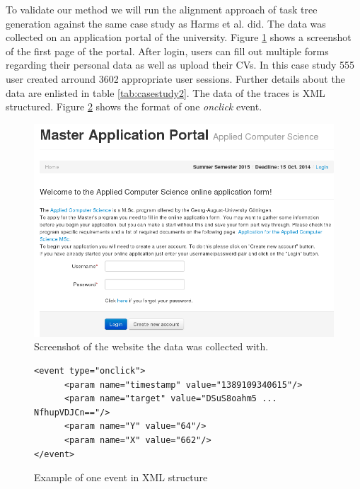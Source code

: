 To validate our method we will run the alignment approach of task tree generation against the same case study as Harms et al. did.
The data was collected on an application portal of the university.
Figure \ref{fig:screenshotmasterportal} shows a screenshot of the first page of the portal.
After login, users can fill out multiple forms regarding their personal data as well as upload their CVs.
In this case study 555 user created arround 3602 appropriate user sessions.
Further details about the data are enlisted in table \ref{tab:casestudy2}.
The data of the traces is XML structured. Figure \ref{fig:xml} shows the format of one \textit{onclick} event.

\begin{figure}
	\includegraphics[width=\textwidth]{chapters/casestudy/masterportalscreenshot.png}
	\caption{Screenshot of the website the data was collected with.}
	\label{fig:screenshotmasterportal}
\end{figure}
\begin{figure}
\begin{verbatim}
<event type="onclick">
      <param name="timestamp" value="1389109340615"/>
      <param name="target" value="DSuS8oahm5 ... NfhupVDJCn=="/>
      <param name="Y" value="64"/>
      <param name="X" value="662"/>
</event>
\end{verbatim}
\caption{Example of one event in XML structure}
\label{fig:xml}
\end{figure}



